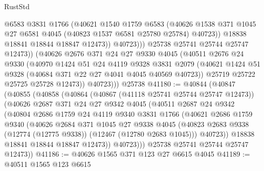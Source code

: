 \begin{lexlean}{RustStd}
\begin{coremodule}
                      @6583
                      @3831
                      @1766
                      (@40621
                        @1540
                        @1759
                        @6583
                        (@40626
                          @1538
                          @371
                          @1045
                          @27
                          @6581
                          @4045
                          (@40823 @1537 @6581 @25780 @25784)
                          @40723))
                      @18838
                      @18841
                      @18844
                      @18847
                      @12473))
                  @40723)))
            @25738
            @25741
            @25744
            @25747
            @12473))
        (@40626
          @2676
          @371
          @24
          @27
          @9330
          @4045
          (@40511
            @2676
            @24
            @9330
            (@40970
              @1424
              @51
              @24
              @4119
              @9328
              @3831
              @2079
              (@40621 @1424 @51 @9328 (@40684 @371 @22 @27 @4041 @4045 @40569 @40723))
              @25719
              @25722
              @25725
              @25728
              @12473))
          @40723)))
    @25738
@41180 := @40844
    (@40847
      (@40855
        (@40858
          (@40864
            (@40867 (@41118 @25741 @25744 @25747 @12473))
            (@40626
              @2687
              @371
              @24
              @27
              @9342
              @4045
              (@40511
                @2687
                @24
                @9342
                (@40804
                  @2686
                  @1759
                  @24
                  @4119
                  @9340
                  @3831
                  @1766
                  (@40621
                    @2686
                    @1759
                    @9340
                    (@40626
                      @2684
                      @371
                      @1045
                      @27
                      @9338
                      @4045
                      (@40823 @2683 @9338 (@12774 (@12775 @9338)) (@12467 (@12780 @2683 @1045)))
                      @40723))
                  @18838
                  @18841
                  @18844
                  @18847
                  @12473))
              @40723)))
        @25738
        @25741
        @25744
        @25747
        @12473))
@41186 := @40626 @1565 @371 @123 @27 @6615 @4045
@41189 := @40511 @1565 @123 @6615

\end{coremodule}
\end{lexlean}
